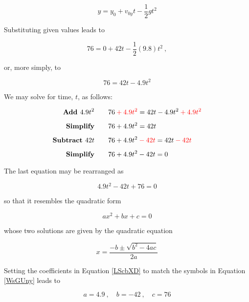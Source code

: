 \documentclass{article}
\begin{document}
\begin{equation*}
    y = y_0 + v_{0y}t - \frac{1}{2}  g t^2
\end{equation*}

Substituting given values leads to 

\begin{equation*}
    76 =  0 + 42 t -\frac{1}{2}(9.8) t^2\ ,
\end{equation*}

or, more simply, to

\begin{equation*}
    76 = 42 t - 4.9 t^2
\end{equation*}

We may solve for time, $t$, as follows:

\begin{align*}
    \textbf{Add $4.9 t^2$} \qquad & 76 \mathbin{\color{red} +} \textcolor{red}{4.9 t^2} = 42 t - 4.9 t^2 \mathbin{\color{red} +} \textcolor{red}{4.9 t^2}\\[1ex]
    \textbf{Simplify} \qquad & 76 + 4.9 t^2 = 42 t\\[1ex]
    \textbf{Subtract $42 t$} \qquad & 76 + 4.9 t^2 \mathbin{\color{red} -} \textcolor{red}{42 t} = 42 t \mathbin{\color{red} -} \textcolor{red}{42 t}\\[1ex]
    \textbf{Simplify} \qquad & 76 + 4.9 t^2 - 42 t = 0
\end{align*}

The last equation may be rearranged as 

\begin{equation} \label{LScbXD}
    4.9 t^2 - 42 t + 76 = 0
\end{equation}

so that it resembles the quadratic form

\begin{equation} \label{WsGUny}
    ax^2 + bx + c = 0
\end{equation}

whose two solutions are given by the quadratic equation

\begin{equation} \label{BMWMHy}
    x = \frac{-b \pm \sqrt{b^2 - 4ac}}{2a}
\end{equation}

Setting the coefficients in Equation \eqref{LScbXD} to match the symbols in Equation \eqref{WsGUny} leads to 

\begin{equation*}
    a = 4.9\ , \quad b = -42\ ,\quad c = 76
\end{equation*}
\end{document}
